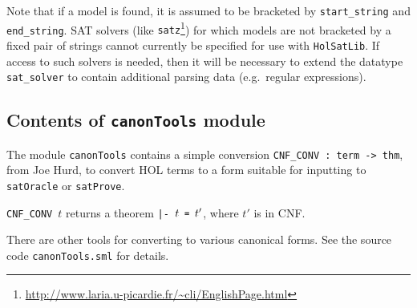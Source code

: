 \documentclass[12pt]{article}
\renewcommand{\t}[1]{\mbox{\small\tt #1}}
\newcommand\HOL{HOL\xspace}
\begin{document}
\medskip

Note that if a model is found, it is assumed to be bracketed
by \t{start\_string} and \t{end\_string}. SAT solvers 
(like {\tt satz}\footnote{\url{http://www.laria.u-picardie.fr/~cli/EnglishPage.html}})
for which models are not bracketed by a fixed pair of strings cannot currently
be specified for use with {\tt HolSatLib}. If access to such solvers is needed, then
it will be necessary to extend the datatype \t{sat\_solver} to contain
additional parsing data (e.g.~regular expressions).

\subsection{Contents of {\tt canonTools} module}

The module {\tt canonTools} contains a simple conversion 
{\small\verb+CNF_CONV : term -> thm+}, 
from Joe Hurd, to convert
\HOL terms to a form suitable for inputting to \t{satOracle} or \t{satProve}.

{\small\verb+CNF_CONV+}~$t$ returns a theorem {\small\verb+|- +}$t\t{~=~}t'$,
where $t'$ is in CNF.

There are other tools for converting to various canonical forms. See the source code
{\small\verb+canonTools.sml+} for details.
\end{document}
